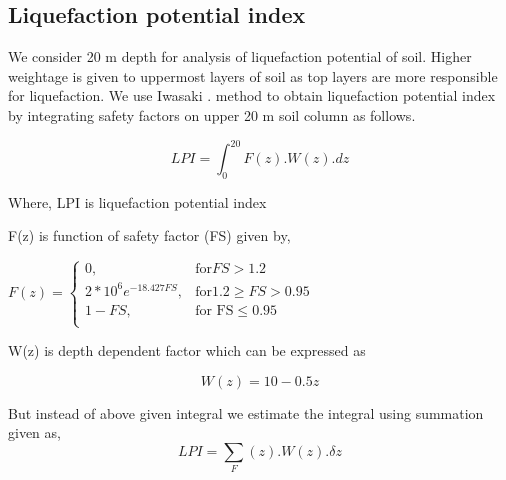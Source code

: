 \subsection{Liquefaction potential index}
We consider 20 m depth for analysis of liquefaction potential of soil. Higher weightage is given to uppermost layers of soil as top layers are more responsible for liquefaction. We use Iwasaki . method to obtain liquefaction potential index by integrating safety factors on upper 20 m soil column as follows.

\begin{equation}
LPI = \int_{0}^{20} F(z).W(z).dz
\end{equation}

Where,
LPI is liquefaction potential index 

F(z) is function of safety factor (FS) given by,

\begin{math}
F(z) = \begin{cases}
	0, & \text{for} FS > 1.2 \\
	2*10^6 e^{-18.427 FS}, & \text{for} 1.2 \geq FS > 0.95 \\
	1-FS, & \text{for FS} \leq 0.95 \\
	\end{cases}
\end{math}

W(z) is  depth dependent factor which can be expressed as 

\begin{equation}
W(z) = 10 - 0.5 z
\end{equation}

But instead of above given integral we estimate the integral using summation given as,
\begin{equation}
LPI = \sum_ F(z).W(z). \delta z
\end{equation}
